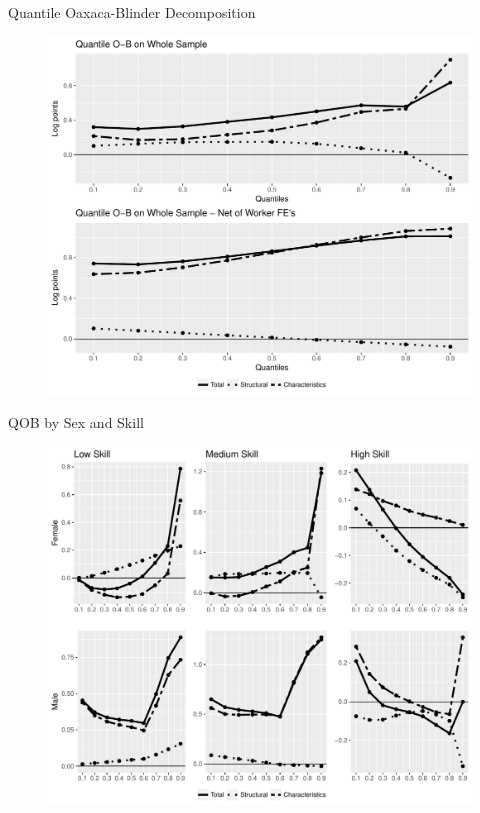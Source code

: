 \documentclass[xcolor={dvipsnames},8pt]{beamer}
\theoremstyle{definition}
\begin{document}
\begin{frame}{Quantile Oaxaca-Blinder Decomposition}
\begin{figure}[h]
    \centering
    \includegraphics[scale = 0.45]{003_qob_debug.pdf}
\end{figure}
\end{frame}

\begin{frame}{QOB by Sex and Skill}

\begin{figure}[h]
    \centering
    \includegraphics[scale = 0.45]{003_qob_gs_debug.pdf}
\end{figure}

\end{frame}
\end{document}
